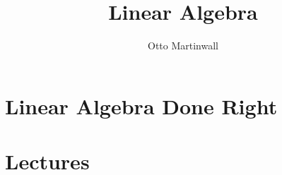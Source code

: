 

\title{Linear Algebra}
\author{Otto Martinwall}


\maketitle
\tableofcontents
\newpage

\newtheorem{definition}{Definition}
\newtheorem{theorem}{Theorem}

\section{Linear Algebra Done Right}


\section{Lectures}




